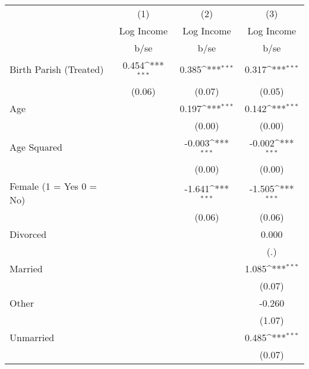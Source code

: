 {
\def\sym#1{\ifmmode^{#1}\else\(^{#1}\)\fi}
\begin{tabular}{l*{3}{c}}
\hline\hline
                    &\multicolumn{1}{c}{(1)}&\multicolumn{1}{c}{(2)}&\multicolumn{1}{c}{(3)}\\
                    &\multicolumn{1}{c}{Log Income}&\multicolumn{1}{c}{Log Income}&\multicolumn{1}{c}{Log Income}\\
                    &        b/se         &        b/se         &        b/se         \\
\hline
Birth Parish (Treated)&       0.454\sym{***}&       0.385\sym{***}&       0.317\sym{***}\\
                    &      (0.06)         &      (0.07)         &      (0.05)         \\
Age                 &                     &       0.197\sym{***}&       0.142\sym{***}\\
                    &                     &      (0.00)         &      (0.00)         \\
Age Squared         &                     &      -0.003\sym{***}&      -0.002\sym{***}\\
                    &                     &      (0.00)         &      (0.00)         \\
Female (1 = Yes 0 = No)&                     &      -1.641\sym{***}&      -1.505\sym{***}\\
                    &                     &      (0.06)         &      (0.06)         \\
Divorced            &                     &                     &       0.000         \\
                    &                     &                     &         (.)         \\
Married             &                     &                     &       1.085\sym{***}\\
                    &                     &                     &      (0.07)         \\
Other               &                     &                     &      -0.260         \\
                    &                     &                     &      (1.07)         \\
Unmarried           &                     &                     &       0.485\sym{***}\\
                    &                     &                     &      (0.07)         \\

\end{tabular}}
